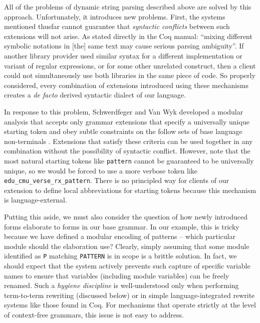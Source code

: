 All of the problems of dynamic string parsing described above are solved by this approach. Unfortunately, it introduces new problems. First, the systems mentioned thusfar cannot guarantee that \emph{syntactic conflicts} between such extensions will not arise. As stated directly in the  Coq manual: ``mixing different symbolic notations in [the] same text may cause serious parsing ambiguity''. If another library provider used similar syntax for a different implementation or variant of regular expressions, or for some other unrelated construct, then a client could not simultaneously use both libraries in the same piece of code. So properly considered, every combination of extensions introduced using these mechanisms creates a \emph{de facto} derived syntactic dialect of our language. %

In response to this problem, Schwerdfeger and Van Wyk developed a modular analysis that accepts only grammar extensions that specify a universally unique starting token and obey subtle constraints on  the follow sets of base language non-terminals \cite{conf/pldi/SchwerdfegerW09}. Extensions that satisfy these criteria can be used together in any combination without the possibility of syntactic conflict. However, note that the most natural starting tokens like \lstinline{pattern} cannot be guaranteed to be universally unique, so we would be forced to use a more verbose token like \lstinline{edu_cmu_verse_rx_pattern}. There is no principled way for clients of our extension to define local abbreviations for starting tokens because this mechanism is language-external.

Putting this aside, we must also consider the question of how newly introduced forms elaborate to forms in our base grammar. In our example, this is tricky because we have defined a modular encoding of patterns -- which particular module should the elaboration use? Clearly, simply assuming that some module identified as \lstinline{P} matching \lstinline{PATTERN} is in scope is a brittle solution. In fact, we should expect that the system actively prevents such capture of specific variable names to ensure that variables (including module variables) can be freely renamed. Such a \emph{hygiene discipline} is well-understood only when performing term-to-term rewriting (discussed below) or in simple language-integrated rewrite systems like those found in Coq. For mechanisms that operate strictly at the level of context-free grammars, this issue is not easy to address.

